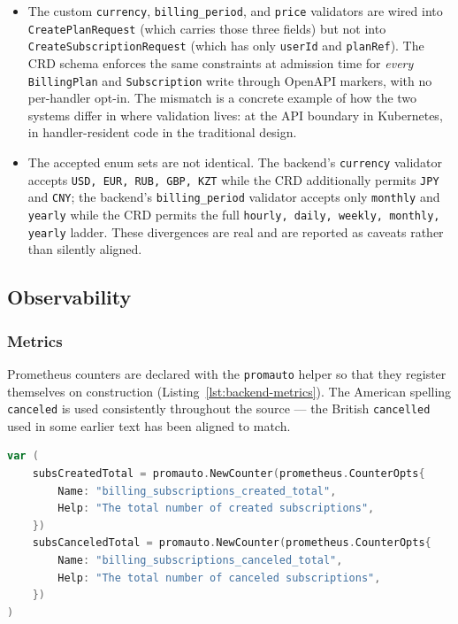 \begin{itemize}
\item The custom \texttt{currency}, \texttt{billing\_period}, and \texttt{price} validators are wired into \texttt{CreatePlanRequest} (which carries those three fields) but not into \texttt{CreateSubscriptionRequest} (which has only \texttt{userId} and \texttt{planRef}). The CRD schema enforces the same constraints at admission time for \emph{every} \texttt{BillingPlan} and \texttt{Subscription} write through OpenAPI markers, with no per-handler opt-in. The mismatch is a concrete example of how the two systems differ in where validation lives: at the API boundary in Kubernetes, in handler-resident code in the traditional design.
\item The accepted enum sets are not identical. The backend's \texttt{currency} validator accepts \texttt{USD, EUR, RUB, GBP, KZT} while the CRD additionally permits \texttt{JPY} and \texttt{CNY}; the backend's \texttt{billing\_period} validator accepts only \texttt{monthly} and \texttt{yearly} while the CRD permits the full \texttt{hourly, daily, weekly, monthly, yearly} ladder. These divergences are real and are reported as caveats rather than silently aligned.
\end{itemize}

\subsection{Observability}

\subsubsection{Metrics}

Prometheus counters are declared with the \texttt{promauto} helper so that they register themselves on construction (Listing~\ref{lst:backend-metrics}). The American spelling \texttt{canceled} is used consistently throughout the source --- the British \texttt{cancelled} used in some earlier text has been aligned to match.

\begin{lstlisting}[language=Go, caption={Backend Prometheus counters}, label={lst:backend-metrics}]
var (
    subsCreatedTotal = promauto.NewCounter(prometheus.CounterOpts{
        Name: "billing_subscriptions_created_total",
        Help: "The total number of created subscriptions",
    })
    subsCanceledTotal = promauto.NewCounter(prometheus.CounterOpts{
        Name: "billing_subscriptions_canceled_total",
        Help: "The total number of canceled subscriptions",
    })
)
\end{lstlisting}

